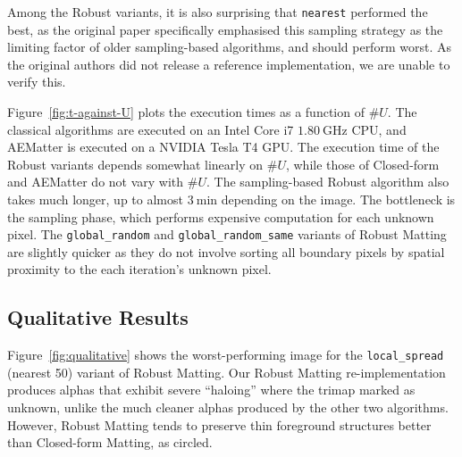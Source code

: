 \documentclass{article}
\theoremstyle{definition}
\begin{document}
\begin{multicols}{2}[]
Among the Robust variants, it is also surprising that \verb|nearest| performed the best, as the original paper specifically emphasised this sampling strategy as the limiting factor of older sampling-based algorithms, and should perform worst. As the original authors did not release a reference implementation, we are unable to verify this.

Figure~\ref{fig:t-against-U} plots the execution times as a function of $\#U$. The classical algorithms are executed on an Intel Core i7 $\SI{1.80}{\giga\hertz}$ CPU, and AEMatter is executed on a NVIDIA Tesla T4 GPU. The execution time of the Robust variants depends somewhat linearly on $\#U$, while those of Closed-form and AEMatter do not vary with $\#U$. The sampling-based Robust algorithm also takes much longer, up to almost $\SI{3}{\minute}$ depending on the image. The bottleneck is the sampling phase, which performs expensive computation for each unknown pixel. The \verb|global_random| and \verb|global_random_same| variants of Robust Matting are slightly quicker as they do not involve sorting all boundary pixels by spatial proximity to the each iteration's unknown pixel.

\subsection{Qualitative Results}
Figure~\ref{fig:qualitative} shows the worst-performing image for the \verb|local_spread| (nearest 50) variant of Robust Matting. Our Robust Matting re-implementation produces alphas that exhibit severe ``haloing'' where the trimap marked as unknown, unlike the much cleaner alphas produced by the other two algorithms. However, Robust Matting tends to preserve thin foreground structures better than Closed-form Matting, as circled.


\end{multicols}
\end{document}
